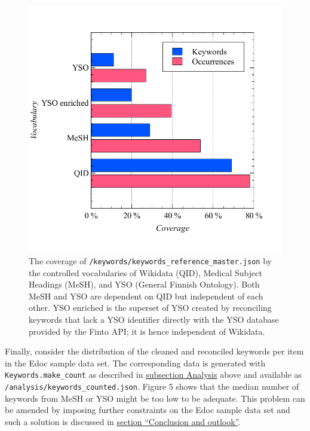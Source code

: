 \begin{figure}
\centering
\includegraphics{images/native_gold_standard.pdf}
\caption{The coverage of
\texttt{/keywords/keywords\_reference\_master.json} by the controlled
vocabularies of Wikidata (QID), Medical Subject Headings (MeSH), and YSO
(General Finnish Ontology). Both MeSH and YSO are dependent on QID but
independent of each other. YSO enriched is the superset of YSO created
by reconciling keywords that lack a YSO identifier directly with the YSO
database provided by the Finto API; it is hence independent of
Wikidata.}
\end{figure}

Finally, consider the distribution of the cleaned and reconciled
keywords per item in the Edoc sample data set. The corresponding data is
generated with \texttt{Keywords.make\_count} as described in
\protect\hyperlink{analysis}{subsection Analysis} above and available as
\texttt{/analysis/keywords\_counted.json}. Figure 5 shows that the
median number of keywords from MeSH or YSO might be too low to be
adequate. This problem can be amended by imposing further constraints on
the Edoc sample data set and such a solution is discussed in
\protect\hyperlink{conclusion-and-outlook}{section ``Conclusion and
outlook''}.

